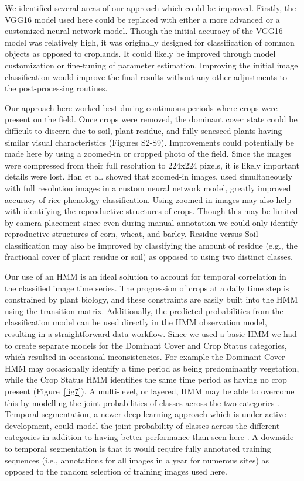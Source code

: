 \documentclass[remotesensing,article,submit,moreauthors,pdftex]{Definitions/mdpi}
\begin{document}
We identified several areas of our approach which could be improved. Firstly, the VGG16 model used here could be replaced with either a more advanced or a customized neural network model. Though the initial accuracy of the VGG16 model was relatively high, it was originally designed for classification of common objects as opposed to croplands. It could likely be improved through model customization or fine-tuning of parameter estimation. Improving the initial image classification would improve the final results without any other adjustments to the post-processing routines. 

Our approach here worked best during continuous periods where crops were present on the field. Once crops were removed, the dominant cover state could be difficult to discern due to soil, plant residue, and fully senesced plants having similar visual characteristics (Figures S2-S9). Improvements could potentially be made here by using a zoomed-in or cropped photo of the field. Since the images were compressed from their full resolution to 224x224 pixels, it is likely important details were lost. Han et al. \citeyear{han-shi2021} showed that zoomed-in images, used simultaneously with full resolution images in a custom neural network model, greatly improved accuracy of rice phenology classification. Using zoomed-in images may also help with identifying the reproductive structures of crops. Though this may be limited by camera placement since even during manual annotation we could only identify reproductive structures of corn, wheat, and barley. Residue versus Soil classification may also be improved by classifying the amount of residue (e.g., the fractional cover of plant residue or soil) as opposed to using two distinct classes. 

Our use of an HMM is an ideal solution to account for temporal correlation in the classified image time series. The progression of crops at a daily time step is constrained by plant biology, and these constraints are easily built into the HMM using the transition matrix. Additionally, the predicted probabilities from the classification model can be used directly in the HMM observation model, resulting in a straightforward data workflow. Since we used a basic HMM we had to create separate models for the Dominant Cover and Crop Status categories, which resulted in occasional inconsistencies. For example the Dominant Cover HMM may occasionally identify a time period as being predominantly vegetation, while the Crop Status HMM identifies the same time period as having no crop present (Figure~\ref{fig7}). A multi-level, or layered, HMM may be able to overcome this by modelling the joint probabilities of classes across the two categories \citep{fine1998}. Temporal segmentation, a newer deep learning approach which is under active development, could model the joint probability of classes across the different categories in addition to having better performance than seen here \citep{lea2016}. A downside to temporal segmentation is that it would require fully annotated training sequences (i.e., annotations for all images in a year for numerous sites) as opposed to the random selection of training images used here. 
\end{document}

